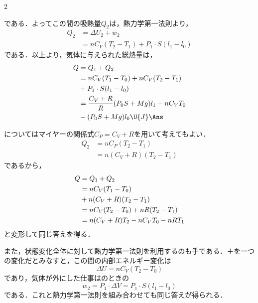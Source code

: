 \begin{multicols}{2}
\begin{komon}
       である．よってこの間の吸熱量$Q_2$は，熱力学第一法則より，
       \[\begin{aligned}
         Q_2&=\Delta U_2+w_2\\
            &=nC_V(T_2-T_1)+P_1\cdot S(l_1-l_0)
       \end{aligned}\]
       である．以上より，気体に与えられた総熱量は，
       \[\begin{aligned}
         Q&=Q_1+Q_2\\
          &=nC_V(T_1-T_0)+nC_V(T_2-T_1)\\
          &\hspace*{\fill}+P_1\cdot S(l_1-l_0)\\
          &=\frac{C_V+R}{R}(P_0S+Mg)l_1-nC_VT_0\\
          &\hspace*{\fill}-(P_0S+Mg)l_0\U{J}\Ans
       \end{aligned}\]
\end{komon}
\begin{bekkai}
についてはマイヤーの関係式$C_P=C_V+R$を用いて考えてもよい．
\[\begin{aligned}
  Q_2&=nC_P(T_2-T_1)\\
     &=n(C_V+R)(T_2-T_1)
\end{aligned}\]
であるから，
\[\begin{aligned}
  Q&=Q_1+Q_2\\
   &=nC_V(T_1-T_0)\\
   &\hspace*{\fill}+n(C_V+R)(T_2-T_1)\\
   &=nC_V(T_2-T_0)+nR(T_2-T_1)\\
   &=n(C_V+R)T_2-nC_VT_0-nRT_1
\end{aligned}\]
と変形して同じ答えを得る．

また，状態変化全体に対して熱力学第一法則を利用するのも手である．＋を一つの変化だとみなすと，この間の内部エネルギー変化は
\[\Delta U=nC_V(T_2-T_0)\]
であり，気体が外にした仕事はのときの
\[w_2=P_1\cdot\Delta V=P_1\cdot S(l_1-l_0)\]
である．これと熱力学第一法則を組み合わせても同じ答えが得られる．
\end{bekkai}


\end{multicols}
